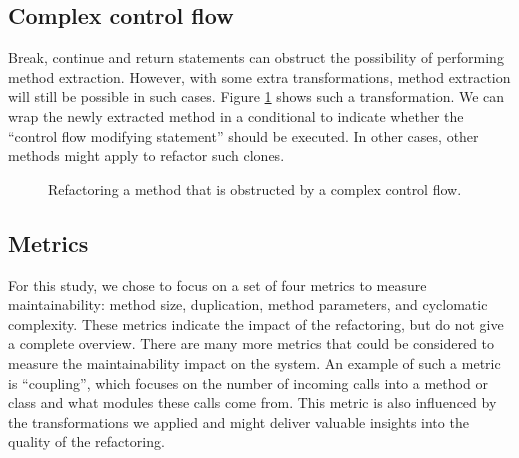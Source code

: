 \subsection{Complex control flow}
Break, continue and return statements can obstruct the possibility of performing method extraction. However, with some extra transformations, method extraction will still be possible in such cases. Figure \ref{fig:complexcontrolflowrefactoring} shows such a transformation. We can wrap the newly extracted method in a conditional to indicate whether the ``control flow modifying statement'' should be executed. In other cases, other methods might apply to refactor such clones.

\begin{figure}[H]
\begin{parcolumns}{2}
\end{parcolumns}
\caption{Refactoring a method that is obstructed by a complex control flow.}
\label{fig:complexcontrolflowrefactoring}
\end{figure}

\subsection{Metrics}
For this study, we chose to focus on a set of four metrics to measure maintainability: method size, duplication, method parameters, and cyclomatic complexity. These metrics indicate the impact of the refactoring, but do not give a complete overview. There are many more metrics that could be considered to measure the maintainability impact on the system. An example of such a metric is ``coupling'', which focuses on the number of incoming calls into a method or class and what modules these calls come from. This metric is also influenced by the transformations we applied and might deliver valuable insights into the quality of the refactoring.

